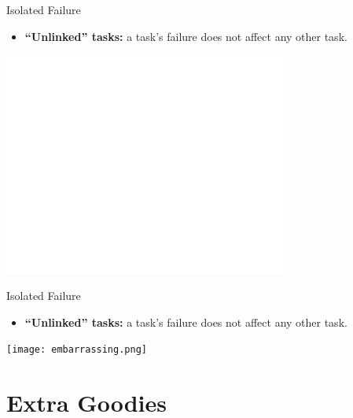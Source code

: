 \documentclass[xcolor=dvipsnames]{beamer}
\begin{document}
\begin{frame}{Isolated Failure}
	\begin{itemize}
		\item {\bf ``Unlinked'' tasks:} a task's failure does not affect any other task.
	\end{itemize}
	\begin{center}
	\includegraphics[width=0.7\textwidth]{embarrassing-blank.png}
	\end{center}
\end{frame}
\begin{frame}{Isolated Failure}
	\begin{itemize}
		\item {\bf ``Unlinked'' tasks:} a task's failure does not affect any other task.
	\end{itemize}
	\begin{center}
	\texttt{[image: embarrassing.png]}
	\end{center}
\end{frame}

\section{Extra Goodies}

\end{document}
